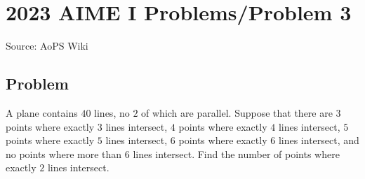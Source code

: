 \documentclass[12pt]{article}
\begin{document}
\section*{{2023 AIME I Problems/Problem 3}}
Source: AoPS Wiki

\subsection*{Problem}
A plane contains $40$ lines, no $2$ of which are parallel. Suppose that there are $3$ points where exactly $3$ lines intersect, $4$ points where exactly $4$ lines intersect, $5$ points where exactly $5$ lines intersect, $6$ points where exactly $6$ lines intersect, and no points where more than $6$ lines intersect. Find the number of points where exactly $2$ lines intersect.
\end{document}
